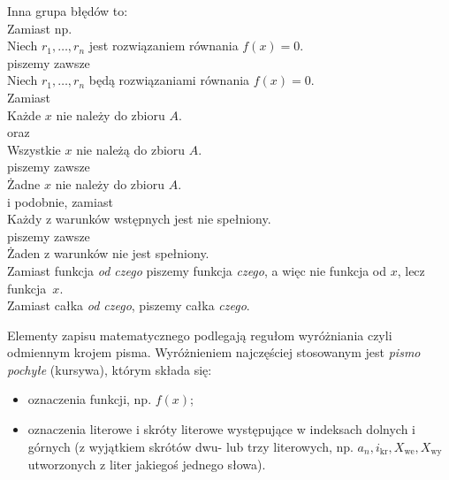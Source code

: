 Inna grupa błędów to:\\
Zamiast np.\\
\hspace*{2cm}Niech $r_1,\dots,r_n$ jest rozwiązaniem równania $f(x)=0$.\\
piszemy zawsze\\
\hspace*{2cm}Niech $r_1,\dots,r_n$ będą rozwiązaniami równania $f(x)=0$.\\
Zamiast\\
\hspace*{2cm}Każde $x$ nie należy do zbioru $A$.\\
oraz\\
\hspace*{2cm}Wszystkie $x$ nie należą do zbioru $A$.\\
piszemy zawsze\\
\hspace*{2cm}Żadne $x$ nie należy do zbioru $A$.\\
i podobnie, zamiast\\
\hspace*{2cm}Każdy z warunków wstępnych jest nie spełniony.\\
piszemy zawsze\\
\hspace*{2cm}Żaden z warunków nie jest spełniony.\\
Zamiast funkcja \textit{od czego} piszemy funkcja \textit{czego}, a więc nie funkcja od $x$, lecz funkcja~$x$.\\
Zamiast całka \textit{od czego}, piszemy całka \textit{czego}.


Elementy zapisu matematycznego podlegają regułom wyróżniania \pauza czyli odmiennym krojem pisma. Wyróżnieniem najczęściej stosowanym jest \textit{pismo pochyłe} (kursywa), którym składa się:
\begin{itemize}
\item oznaczenia funkcji, np. $f(x)$;
\item oznaczenia literowe i skróty literowe występujące w indeksach dolnych i górnych (z wyjątkiem skrótów dwu- lub trzy literowych, np. $a_n, i_{\mathrm{kr}}, X_{\mathrm{we}}, X_{\mathrm{wy}}$ utworzonych z liter jakiegoś jednego słowa).
\end{itemize}


